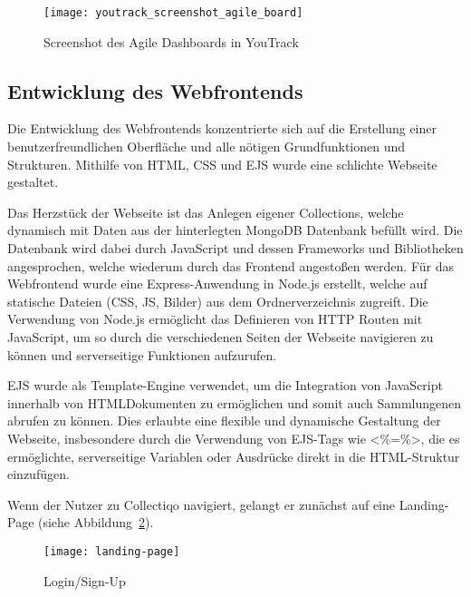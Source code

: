 \begin{figure}[h]
    \centering
    \texttt{[image: youtrack\_screenshot\_agile\_board]}
    \caption{Screenshot des Agile Dashboards in YouTrack}
    \label{fig:youtrack_screenshot_agile_board}
\end{figure}

\subsection{Entwicklung des Webfrontends}\label{subsec:entwicklung-des-webfrontends}
Die Entwicklung des Webfrontends konzentrierte sich auf die Erstellung einer benutzerfreundlichen Oberfläche und alle nötigen Grundfunktionen und Strukturen.
Mithilfe von HTML, CSS und EJS wurde eine schlichte Webseite gestaltet.

Das Herzstück der Webseite ist das Anlegen eigener Collections, welche dynamisch mit Daten aus der hinterlegten MongoDB Datenbank befüllt wird.
Die Datenbank wird dabei durch JavaScript und dessen Frameworks und Bibliotheken angesprochen, welche wiederum durch das Frontend angestoßen werden.
Für das Webfrontend wurde eine Express-Anwendung in Node.js erstellt, welche auf statische Dateien (CSS, JS, Bilder) aus dem Ordnerverzeichnis zugreift.
Die Verwendung von Node.js ermöglicht das Definieren von HTTP Routen mit JavaScript, um so durch die verschiedenen Seiten der Webseite navigieren zu können und serverseitige Funktionen aufzurufen.

EJS wurde als Template-Engine verwendet, um die Integration von JavaScript innerhalb von HTMLDokumenten zu ermöglichen und somit auch Sammlungenen abrufen zu können.
Dies erlaubte eine flexible und dynamische Gestaltung der Webseite, insbesondere durch die Verwendung von EJS-Tags wie \grqq\textless{}\%=\%\textgreater{}\grqq{}, die es ermöglichte, serverseitige Variablen oder Ausdrücke direkt in die HTML-Struktur einzufügen.

Wenn der Nutzer zu Collectiqo navigiert, gelangt er zunächst auf eine Landing-Page (siehe Abbildung~\ref{fig:landing-page}).

\begin{figure}[h]
    \centering
    \texttt{[image: landing-page]}
    \caption{Login/Sign-Up}
    \label{fig:landing-page}
\end{figure}

